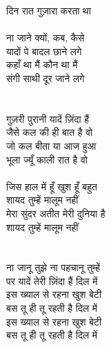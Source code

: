 {{{{{{{{{{{{{{{{{{{{{{{{{{{{{{{{{{{{{{{{{{{{{दिन रात गुज़ारा करता था\\
\\
ना जाने क्यों, कब, कैसे\\
यादों पे बादल छाने लगे\\
कहाँ था मैं कौन था मैं\\
संगी साथी दूर जाने लगे\\
\\
\\
गुज़री पुरानी यादें ज़िंदा हैं\\
जैसे कल की ही बात है वो\\
जो कल बीता या आज हुआ\\
भूला ज्यूँ काली रात है वो\\
\\
जिस हाल में हूँ खुश हूँ बहुत\\
शायद तुम्हें मालूम नहीं\\
मेरा सुंदर अतीत मेरी दुनिया है\\
शायद तुम्हें मालूम नहीं\\
\\
\\
ना जानू तुझे ना पहचानू तुम्हें\\
पर यादें तेरी ज़िंदा हैं दिल में\\
इस ख्याल से रहना खुश बेटी\\
बस तू ही तू रहती है दिल में\\
इस ख्याल से रहना खुश बेटी\\
बस तू ही तू रहती है दिल में\\
\\
\\
\\
\\
}}}}}}}}}}}}}}}}}}}}}}}}}}}}}}}}}}}}}}}}}}}}}
